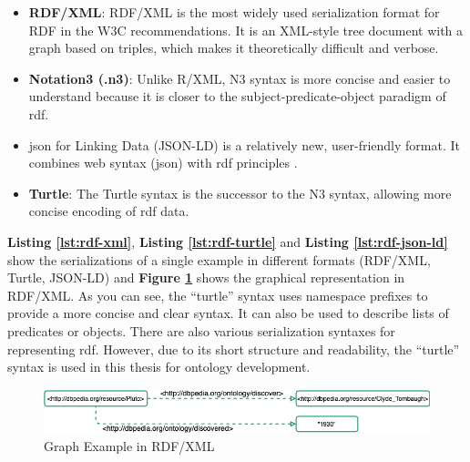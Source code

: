                 \begin{itemize}
                    \item \textbf{RDF/XML}: RDF/XML is the most widely used serialization format for RDF in the W3C recommendations. It is an XML-style tree document with a graph based on triples, which makes it theoretically difficult and verbose. 
                    
                    \item \textbf{Notation3 (.n3)}: Unlike R/XML, N3 syntax is more concise and easier to understand because it is closer to the subject-predicate-object paradigm of \acrshort{rdf}. 
                    
                    \item \acrfull{json} for Linking Data (JSON-LD) is a relatively new, user-friendly format. It combines web syntax (\acrshort{json}) with \acrshort{rdf} principles \cite{grlicky2005overview}. 
                    
                    \item \textbf{Turtle}: The Turtle syntax is the successor to the N3 syntax, allowing more concise encoding of \acrshort{rdf} data.
                \end{itemize}

                \textbf{Listing \ref{lst:rdf-xml}}, \textbf{Listing \ref{lst:rdf-turtle}} and \textbf{Listing \ref{lst:rdf-json-ld}} show the serializations of a single example in different formats (RDF/XML, Turtle, JSON-LD) and \textbf{Figure \ref{fig:rdf-xml-example}} shows the graphical representation in RDF/XML. As you can see, the “turtle” syntax uses namespace prefixes to provide a more concise and clear syntax. It can also be used to describe lists of predicates or objects. There are also various serialization syntaxes for representing \acrshort{rdf}. However, due to its short structure and readability, the “turtle” syntax is used in this thesis for ontology development.\\
            
                \begin{figure}[H]
                    \centering
                    \includegraphics[scale=0.6]{images/Foundation-RDF XML.drawio.png}
                    \caption{\label{fig:rdf-xml-example}  Graph Example in RDF/XML}
                \end{figure}

